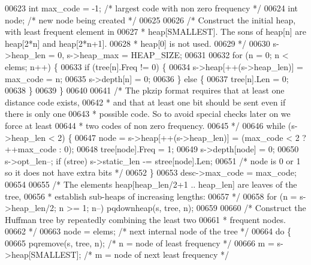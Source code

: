 \begin{DoxyCode}
{{{{{{{{{{{{00623     \textcolor{keywordtype}{int} max\_code = -1; \textcolor{comment}{/* largest code with non zero frequency */}
00624     \textcolor{keywordtype}{int} node;          \textcolor{comment}{/* new node being created */}
00625 
00626     \textcolor{comment}{/* Construct the initial heap, with least frequent element in}
00627 \textcolor{comment}{     * heap[SMALLEST]. The sons of heap[n] are heap[2*n] and heap[2*n+1].}
00628 \textcolor{comment}{     * heap[0] is not used.}
00629 \textcolor{comment}{     */}
00630     s->heap\_len = 0, s->heap\_max = HEAP\_SIZE;
00631 
00632     \textcolor{keywordflow}{for} (n = 0; n < elems; n++) \{
00633         \textcolor{keywordflow}{if} (tree[n].Freq != 0) \{
00634             s->heap[++(s->heap\_len)] = max\_code = n;
00635             s->depth[n] = 0;
00636         \} \textcolor{keywordflow}{else} \{
00637             tree[n].Len = 0;
00638         \}
00639     \}
00640 
00641     \textcolor{comment}{/* The pkzip format requires that at least one distance code exists,}
00642 \textcolor{comment}{     * and that at least one bit should be sent even if there is only one}
00643 \textcolor{comment}{     * possible code. So to avoid special checks later on we force at least}
00644 \textcolor{comment}{     * two codes of non zero frequency.}
00645 \textcolor{comment}{     */}
00646     \textcolor{keywordflow}{while} (s->heap\_len < 2) \{
00647         node = s->heap[++(s->heap\_len)] = (max\_code < 2 ? ++max\_code : 0);
00648         tree[node].Freq = 1;
00649         s->depth[node] = 0;
00650         s->opt\_len--; \textcolor{keywordflow}{if} (stree) s->static\_len -= stree[node].Len;
00651         \textcolor{comment}{/* node is 0 or 1 so it does not have extra bits */}
00652     \}
00653     desc->max\_code = max\_code;
00654 
00655     \textcolor{comment}{/* The elements heap[heap\_len/2+1 .. heap\_len] are leaves of the tree,}
00656 \textcolor{comment}{     * establish sub-heaps of increasing lengths:}
00657 \textcolor{comment}{     */}
00658     \textcolor{keywordflow}{for} (n = s->heap\_len/2; n >= 1; n--) pqdownheap(s, tree, n);
00659 
00660     \textcolor{comment}{/* Construct the Huffman tree by repeatedly combining the least two}
00661 \textcolor{comment}{     * frequent nodes.}
00662 \textcolor{comment}{     */}
00663     node = elems;              \textcolor{comment}{/* next internal node of the tree */}
00664     \textcolor{keywordflow}{do} \{
00665         pqremove(s, tree, n);  \textcolor{comment}{/* n = node of least frequency */}
00666         m = s->heap[SMALLEST]; \textcolor{comment}{/* m = node of next least frequency */}
}}}}}}}}}}}}
\end{DoxyCode}
